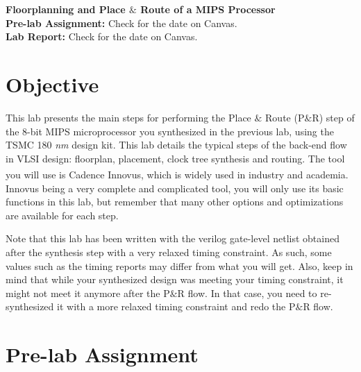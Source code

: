 \newcommand{\labtitle}{ECE/CS 5710/6710 - Lab 5}
\newcommand{\labsubtitle}{Floorplanning and Place $\&$ Route of a MIPS Processor}
\vlsiheader

\begin{center}
	\LARGE\textbf{\labsubtitle} \\
	\large\textbf{Pre-lab Assignment:} Check for the date on Canvas. \\
	\large\textbf{Lab Report:} Check for the date on Canvas.
\end{center}
\section{Objective}
This lab presents the main steps for performing the Place $\&$ Route (P$\&$R) step of the 8-bit MIPS microprocessor you synthesized in the previous lab, using the TSMC 180 \emph{nm} design kit. This lab details the typical steps of the back-end flow in VLSI design: floorplan, placement, clock tree synthesis and routing. The tool you will use is Cadence Innovus\textsuperscript{\tiny\textregistered}, which is widely used in industry and academia. Innovus being a very complete and complicated tool, you will only use its basic functions in this lab, but remember that many other options and optimizations are available for each step.
\begin{remark}
Note that this lab has been written with the verilog gate-level netlist obtained after the synthesis step with a very relaxed timing constraint. As such, some values such as the timing reports may differ from what you will get. Also, keep in mind that while your synthesized design was meeting your timing constraint, it might not meet it anymore after the P$\&$R flow. In that case, you need to re-synthesized it with a more relaxed timing constraint and redo the P$\&$R flow.
\end{remark}


\section{Pre-lab Assignment}

